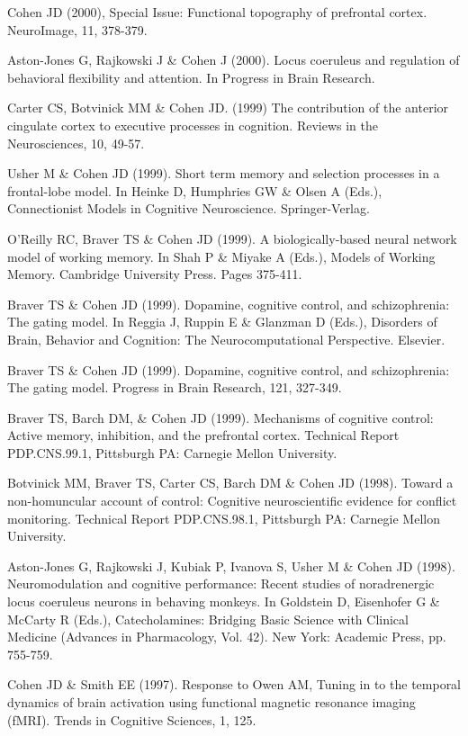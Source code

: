 \documentclass[10 pt]{article}
\begin{document}
Cohen JD (2000), Special Issue: Functional topography of prefrontal cortex. NeuroImage, 11, 378-379.

Aston-Jones G, Rajkowski J \& Cohen J (2000). Locus coeruleus and regulation of behavioral flexibility and attention. In Progress in Brain Research.

Carter CS, Botvinick MM \& Cohen JD. (1999) The contribution of the anterior cingulate cortex to executive processes in cognition. Reviews in the Neurosciences, 10, 49-57.

Usher M \& Cohen JD (1999). Short term memory and selection processes in a frontal-lobe model. In Heinke D, Humphries GW \& Olsen A (Eds.), Connectionist Models in Cognitive Neuroscience. Springer-Verlag.

O'Reilly RC, Braver TS \& Cohen JD (1999). A biologically-based neural network model of working memory. In Shah P \& Miyake A (Eds.), Models of Working Memory. Cambridge University Press. Pages 375-411.

Braver TS \& Cohen JD (1999). Dopamine, cognitive control, and schizophrenia: The gating model. In Reggia J, Ruppin E \& Glanzman D (Eds.), Disorders of Brain, Behavior and Cognition: The Neurocomputational Perspective. Elsevier.

Braver TS \& Cohen JD (1999). Dopamine, cognitive control, and schizophrenia: The gating model. Progress in Brain Research, 121, 327-349.

Braver TS, Barch DM, \& Cohen JD (1999). Mechanisms of cognitive control: Active memory, inhibition, and the prefrontal cortex. Technical Report PDP.CNS.99.1, Pittsburgh PA: Carnegie Mellon University.

Botvinick MM, Braver TS, Carter CS, Barch DM \& Cohen JD (1998). Toward a non-homuncular account of control: Cognitive neuroscientific evidence for conflict monitoring. Technical Report PDP.CNS.98.1, Pittsburgh PA: Carnegie Mellon University.

Aston-Jones G, Rajkowski J, Kubiak P, Ivanova S, Usher M \& Cohen JD (1998). Neuromodulation and cognitive performance: Recent studies of noradrenergic locus coeruleus neurons in behaving monkeys. In Goldstein D, Eisenhofer G \& McCarty R (Eds.), Catecholamines: Bridging Basic Science with Clinical Medicine (Advances in Pharmacology, Vol. 42). New York: Academic Press, pp. 755-759.

Cohen JD \& Smith EE (1997). Response to Owen AM, Tuning in to the temporal dynamics of brain activation using functional magnetic resonance imaging (fMRI). Trends in Cognitive Sciences, 1, 125.
\end{document}
